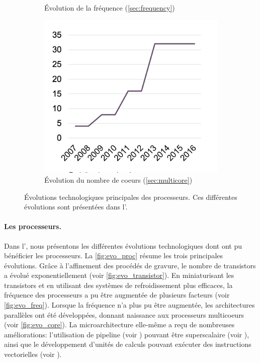 \begin{figure}[t!]
\begin{subfigure}[t]{0.33\textwidth}
                \caption{\label{fig:evo_freq}Évolution de la fréquence (\autoref{sec:frequency})}
            \end{subfigure}\hfill
            \begin{subfigure}[t]{0.33\textwidth}
                    \centering
                    \includegraphics[width=\linewidth]{images/evo_core.png}
                    \caption{\label{fig:evo_core}Évolution du nombre de coeurs (\autoref{sec:multicore})}
            \end{subfigure}
            \caption{\label{fig:evo_proc}Évolutions technologiques principales des processeurs. Ces différentes évolutions sont présentées dans l'.}
        \end{figure}
        
            \paragraph{Les processeurs.} Dans l', nous présentons les différentes évolutions technologiques dont ont pu bénéficier les processeurs. La \autoref{fig:evo_proc} résume les trois principales évolutions.
            Grâce à l'affinement des procédés de gravure, le nombre de transistors a évolué exponentiellement (voir \autoref{fig:evo_transistor}).  
            En miniaturisant les transistors et en utilisant des systèmes de refroidissement plus efficaces, la fréquence des processeurs a pu être augmentée de plusieurs facteurs (voir \autoref{fig:evo_freq}).
            Lorsque la fréquence n'a plus pu être augmentée, les architectures parallèles ont été développées, donnant naissance aux processeurs multicoeurs (voir \autoref{fig:evo_core}). La microarchitecture elle-même a reçu de nombreuses améliorations: l'utilisation de pipeline (voir ) pouvant être superscalaire (voir ), ainsi que le développement d'unités de calculs pouvant exécuter des instructions vectorielles (voir ).
            
